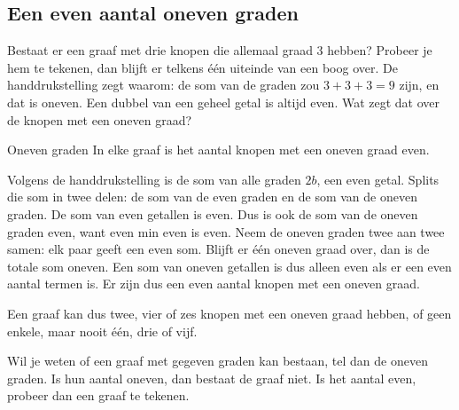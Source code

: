 \subsection{Een even aantal oneven graden}

Bestaat er een graaf met drie knopen die allemaal graad 3 hebben? Probeer je hem te tekenen, dan blijft er telkens één uiteinde van een boog over. De handdrukstelling zegt waarom: de som van de graden zou $3 + 3 + 3 = 9$ zijn, en dat is oneven. Een dubbel van een geheel getal is altijd even. Wat zegt dat over de knopen met een oneven graad?

\begin{theorie}
\begin{stelling}{Oneven graden}
In elke graaf is het aantal knopen met een oneven graad even.
\end{stelling}
\begin{bewijs}
Volgens de handdrukstelling is de som van alle graden $2b$, een even getal. Splits die som in twee delen: de som van de even graden en de som van de oneven graden. De som van even getallen is even. Dus is ook de som van de oneven graden even, want even min even is even. Neem de oneven graden twee aan twee samen: elk paar geeft een even som. Blijft er één oneven graad over, dan is de totale som oneven. Een som van oneven getallen is dus alleen even als er een even aantal termen is. Er zijn dus een even aantal knopen met een oneven graad.
\end{bewijs}
\end{theorie}

Een graaf kan dus twee, vier of zes knopen met een oneven graad hebben, of geen enkele, maar nooit één, drie of vijf.


\begin{werkwijze}
Wil je weten of een graaf met gegeven graden kan bestaan, tel dan de oneven graden. Is hun aantal oneven, dan bestaat de graaf niet. Is het aantal even, probeer dan een graaf te tekenen.
\end{werkwijze}

